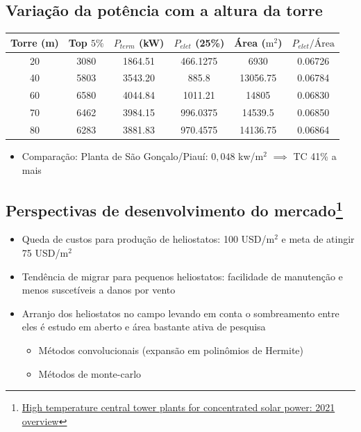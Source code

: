 \documentclass[12pt,notheorems,hyperref={pdfauthor= Rafael Nardi}]{beamer}
\begin{document}
\subsection{Variação da potência com a altura da torre}

\begin{frame}%
	\begin{table}
		\begin{tabular}[scale=0.7]{cccccc}
			\toprule
			Torre (m) & Top $5\%$ & $P_{term}$ (kW) & $P_{elet}$ (25\%) & Área ($\text{m}^2$) & $P_{elet} /\text{Área}$ \\
			\midrule
			20 & 3080 & 1864.51 & 466.1275 & 6930 & 0.06726 \\
			40 & 5803 & 3543.20 & 885.8 & 13056.75 & 0.06784 \\
			60 & 6580 & 4044.84 & 1011.21 & 14805 & 0.06830 \\
			70 & 6462 & 3984.15 & 996.0375 & 14539.5 & 0.06850 \\
			80 & 6283 & 3881.83 & 970.4575 & 14136.75 & 0.06864 \\
		\end{tabular}
	\end{table}\pause
	\bigskip
	\begin{itemize}
		\item Comparação: Planta de São Gonçalo/Piauí: $0,048$ kw/$\text{m}^2$ $\implies$ TC 41\% a mais
	\end{itemize}
\end{frame}

\subsection{Perspectivas de desenvolvimento do mercado\footnote{\href{https://reader.elsevier.com/reader/sd/pii/S1364032121010923}{High temperature central tower plants for concentrated solar power: 2021 overview}}}

\begin{frame}
	\begin{itemize}
		\item Queda de custos para produção de heliostatos: 100 USD/$\text{m}^2$ e
			meta de atingir 75 USD/$\text{m}^2$ \pause
			\bigskip
		\item Tendência de migrar para pequenos heliostatos: facilidade de
			manutenção e menos suscetíveis a danos por vento\pause
			\bigskip
		\item Arranjo dos heliostatos no campo levando em conta o sombreamento
			entre eles é estudo em aberto e área bastante ativa de pesquisa
			\medskip
			\begin{itemize}
				\item Métodos convolucionais (expansão em polinômios de Hermite)
					\medskip
				\item Métodos de monte-carlo
			\end{itemize}
	\end{itemize}
\end{frame}
\end{document}
